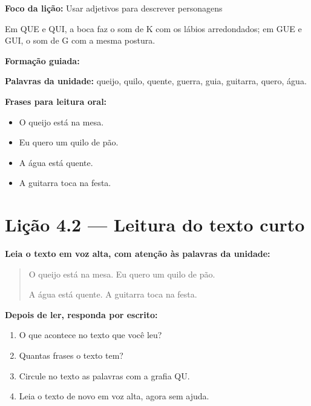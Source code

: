 \textbf{Foco da lição:} Usar adjetivos para descrever personagens


\begin{boquinha}
Em QUE e QUI, a boca faz o som de K com os lábios arredondados; em GUE e GUI, o som de G com a mesma postura.
\end{boquinha}

\noindent\textbf{Formação guiada:}

\begin{center}
\end{center}

\noindent\textbf{Palavras da unidade:} queijo, quilo, quente, guerra, guia, guitarra, quero, água.

\noindent\textbf{Frases para leitura oral:}
\begin{itemize}[leftmargin=1.6em]
  \item O queijo está na mesa.
  \item Eu quero um quilo de pão.
  \item A água está quente.
  \item A guitarra toca na festa.
\end{itemize}

\section{Lição 4.2 --- Leitura do texto curto}

\noindent\textbf{Leia o texto em voz alta, com atenção às palavras da unidade:}


\begin{quote}
O queijo está na mesa. Eu quero um quilo de pão.

A água está quente. A guitarra toca na festa.
\end{quote}

\textbf{Depois de ler, responda por escrito:}
\begin{enumerate}

  \item O que acontece no texto que você leu?
  \begin{center}
  \underline{\hspace{12cm}}
  \end{center}

  \item Quantas frases o texto tem?
  \begin{center}
  \underline{\hspace{12cm}}
  \end{center}

  \item Circule no texto as palavras com a grafia QU.

  \item Leia o texto de novo em voz alta, agora sem ajuda.

\end{enumerate}

